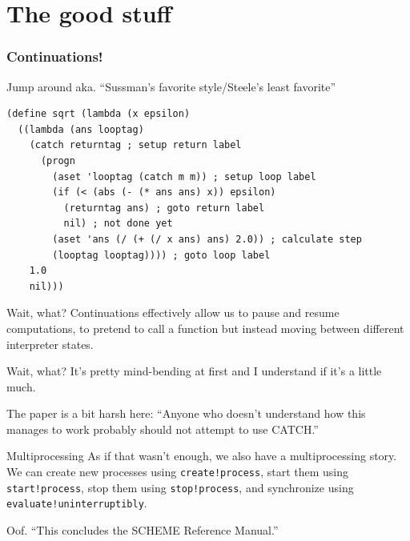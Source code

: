 \documentclass[aspectratio=169]{beamer}
\begin{document}
  \section{The good stuff}
  \begin{frame}[fragile]
    \frametitle{Continuations!}
    \begin{listing}[H]
      \caption{Jump around aka. “Sussman’s favorite style/Steele’s least favorite”}
      \begin{verbatim}
(define sqrt (lambda (x epsilon)
  ((lambda (ans looptag)
    (catch returntag ; setup return label
      (progn
        (aset 'looptag (catch m m)) ; setup loop label
        (if (< (abs (- (* ans ans) x)) epsilon)
          (returntag ans) ; goto return label
          nil) ; not done yet
        (aset 'ans (/ (+ (/ x ans) ans) 2.0)) ; calculate step
        (looptag looptag)))) ; goto loop label
    1.0
    nil)))
      \end{verbatim}
    \end{listing}
  \end{frame}
  \begin{frame}{Wait, what?}
    Continuations effectively allow us to pause and resume computations, to
    pretend to call a function but instead moving between different interpreter
    states.
  \end{frame}
  \begin{frame}{Wait, what?}
    It’s pretty mind-bending at first and I understand if it’s a little much.

    \bigskip

    \small The paper is a bit harsh here: “Anyone who doesn’t understand how
    this manages to work probably should not attempt to use CATCH.”
  \end{frame}
  \begin{frame}{Multiprocessing}
    As if that wasn’t enough, we also have a multiprocessing story. We can
    create new processes using \texttt{create!process}, start them using
    \texttt{start!process}, stop them using \texttt{stop!process}, and
    synchronize using \texttt{evaluate!uninterruptibly}.
  \end{frame}
  \begin{frame}{Oof.}
    “This concludes the SCHEME Reference Manual.”
  \end{frame}
\end{document}
